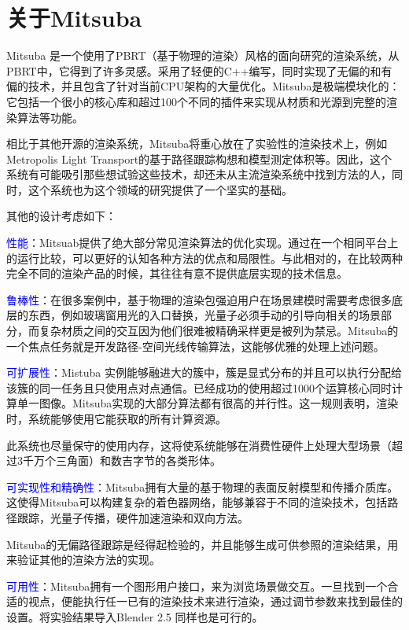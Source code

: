 \chapter{关于Mitsuba}
Mitsuba 是一个使用了PBRT（基于物理的渲染）风格的面向研究的渲染系统，从PBRT中，它得到了许多灵感。采用了轻便的C++编写，同时实现了无偏的和有偏的技术，并且包含了针对当前CPU架构的大量优化。Mitsuba是极端模块化的：它包括一个很小的核心库和超过100个不同的插件来实现从材质和光源到完整的渲染算法等功能。
\par
相比于其他开源的渲染系统，Mitsuba将重心放在了实验性的渲染技术上，例如Metropolis Light Transport的基于路径跟踪构想和模型测定体积等。因此，这个系统有可能吸引那些想试验这些技术，却还未从主流渲染系统中找到方法的人，同时，这个系统也为这个领域的研究提供了一个坚实的基础。
\par
其他的设计考虑如下：
\par
\textcolor{blue}{性能}：Mitsuab提供了绝大部分常见渲染算法的优化实现。通过在一个相同平台上的运行比较，可以更好的认知各种方法的优点和局限性。与此相对的，在比较两种完全不同的渲染产品的时候，其往往有意不提供底层实现的技术信息。
\par
\textcolor{blue}{鲁棒性}：在很多案例中，基于物理的渲染包强迫用户在场景建模时需要考虑很多底层的东西，例如玻璃窗用光的入口替换，光量子必须手动的引导向相关的场景部分，而复杂材质之间的交互因为他们很难被精确采样更是被列为禁忌。Mitsuba的一个焦点任务就是开发路径-空间光线传输算法，这能够优雅的处理上述问题。
\par 
\textcolor{blue}{可扩展性}：Mistuba 实例能够融进大的簇中，簇是显式分布的并且可以执行分配给该簇的同一任务且只使用点对点通信。已经成功的使用超过1000个运算核心同时计算单一图像。Mitsuba实现的大部分算法都有很高的并行性。这一规则表明，渲染时，系统能够使用它能获取的所有计算资源。
\par 
此系统也尽量保守的使用内存，这将使系统能够在消费性硬件上处理大型场景（超过3千万个三角面）和数吉字节的各类形体。
\par
\textcolor{blue}{可实现性和精确性}：Mitsuba拥有大量的基于物理的表面反射模型和传播介质库。这使得Mitsuba可以构建复杂的着色器网络，能够兼容于不同的渲染技术，包括路径跟踪，光量子传播，硬件加速渲染和双向方法。
\par 
Mitsuba的无偏路径跟踪是经得起检验的，并且能够生成可供参照的渲染结果，用来验证其他的渲染方法的实现。
\par 
\textcolor{blue}{可用性}：Mitsuba拥有一个图形用户接口，来为浏览场景做交互。一旦找到一个合适的视点，便能执行任一已有的渲染技术来进行渲染，通过调节参数来找到最佳的设置。将实验结果导入Blender 2.5 同样也是可行的。


